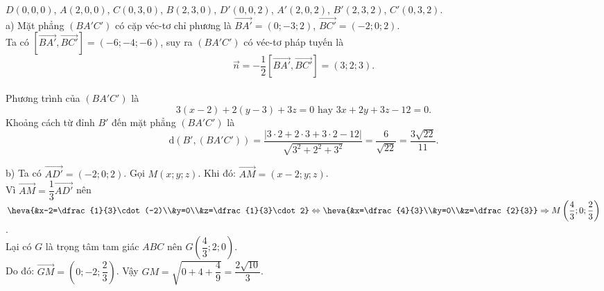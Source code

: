 \begin{vd}
{		$D(0,0,0)$, $A(2,0,0)$, $C(0,3,0)$, $B(2,3,0)$, $D'(0,0,2)$, $A'(2,0,2)$, $B'(2,3,2)$, $C'(0,3,2)$.\\
		a) Mặt phẳng $(BA'C')$ có cặp véc-tơ chỉ phương là
		$\overrightarrow{BA'}=(0;-3;2)$, $\overrightarrow{BC'}=(-2;0;2)$. \\
		Ta có $\left[ \overrightarrow{BA'}, \overrightarrow{BC'} \right] =(-6;-4;-6)$, suy ra $(BA'C')$ có véc-tơ pháp tuyến là 
		$$\overrightarrow{n} = -\dfrac{1}{2} \left[ \overrightarrow{BA'}, \overrightarrow{BC'} \right] = (3;2;3).$$\\
		Phương trình của $(BA'C')$ là
		$$3(x-2)+2(y-3)+3z=0 \text{ hay } 3x+2y+3z-12=0.$$
		Khoảng cách từ đỉnh $B'$ đến mặt phẳng $(BA'C')$ là
		$$\mathrm{d} (B', (BA'C')) = \dfrac{\left| 3 \cdot 2 + 2 \cdot 3 + 3 \cdot 2 - 12 \right|}{\sqrt{3^2+2^2+3^2}}=\dfrac{6}{\sqrt{22}}=\dfrac{3 \sqrt{22}}{11}.$$
		
		b) Ta có $\vec{AD'}=(-2;0;2)$. Gọi $M(x;y;z)$. Khi đó: $\vec{AM}=(x-2;y;z)$.\\
		Vì $\vec{AM}=\dfrac{1}{3}\vec{AD'}$ nên $\heva{&x-2=\dfrac{1}{3}\cdot(-2)\\&y=0\\&z=\dfrac{1}{3}\cdot 2}\Leftrightarrow\heva{&x=\dfrac{4}{3}\\&y=0\\&z=\dfrac{2}{3}}\Rightarrow M\left(\dfrac{4}{3};0;\dfrac{2}{3}\right)$.\\
		Lại có $G$ là trọng tâm tam giác $ABC$ nên $G\left(\dfrac{4}{3};2;0\right)$.\\
		Do đó: $\vec{GM}=\left(0;-2;\dfrac{2}{3}\right)$. Vậy $GM=\sqrt{0+4+\dfrac{4}{9}}=\dfrac{2\sqrt{10}}{3}$.
	} 
\end{vd}
